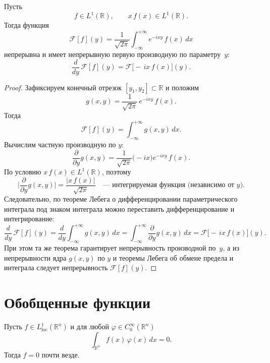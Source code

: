\begin{theorem}
Пусть
\[
f\in L^1(\mathbb R),
\qquad
x\,f(x)\in L^1(\mathbb R).
\]
Тогда функция
\[
\mathcal F[f](y)
=\frac1{\sqrt{2\pi}}\int_{-\infty}^{+\infty}e^{-i x y}\,f(x)\,dx
\]
непрерывна и имеет непрерывную первую производную по параметру~$y$:
\[
\frac{d}{dy}\,\mathcal F[f](y)
=\mathcal F\bigl[-\,i x\,f(x)\bigr](y).
\]
\end{theorem}

\begin{proof}
Зафиксируем конечный отрезок $[y_1,y_2]\subset\mathbb R$ и положим
\[
g(x,y)
=\frac1{\sqrt{2\pi}}\,e^{-i x y}\,f(x).
\]
Тогда
\[
\mathcal F[f](y)=\int_{-\infty}^{+\infty}g(x,y)\,dx.
\]
Вычислим частную производную по $y$:
\[
\frac{\partial}{\partial y}g(x,y)
=\frac1{\sqrt{2\pi}}\bigl(-i x\bigr)e^{-i x y}\,f(x).
\]
По условию $x\,f(x)\in L^1(\mathbb R)$, поэтому
\[
\biggl|\frac{\partial}{\partial y}g(x,y)\biggr|
=\frac{|x\,f(x)|}{\sqrt{2\pi}}
\quad\text{— интегрируемая функция (независимо от $y$).}
\]
Следовательно, по теореме Лебега о дифференцировании параметрического
интеграла под знаком интеграла можно переставить дифференцирование и
интегрирование:
\[
\frac{d}{dy}\,\mathcal F[f](y)
=\frac{d}{dy}\int_{-\infty}^{+\infty}g(x,y)\,dx
=\int_{-\infty}^{+\infty}\frac{\partial}{\partial y}g(x,y)\,dx
=\mathcal F\bigl[-\,i x\,f(x)\bigr](y).
\]
При этом та же теорема гарантирует непрерывность производной по~$y$,
а из непрерывности ядра $g(x,y)$ по $y$ и теоремы Лебега об обмене
предела и интеграла следует непрерывность $\mathcal F[f](y)$.
\end{proof}


\section{Обобщенные функции}

\begin{lemma}
Пусть $f\in L^1_{\mathrm{loc}}(\mathbb R^n)$ и для любой $\varphi\in C_0^\infty(\mathbb R^n)$
\[
\int_{\mathbb R^n}f(x)\,\varphi(x)\,dx=0.
\]
Тогда $f=0$ почти везде.
\end{lemma}

